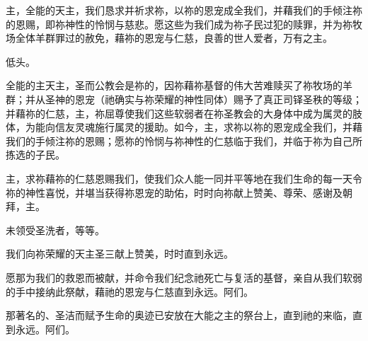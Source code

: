 \par

主，全能的天主，我们恳求并祈求祢，以祢的恩宠成全我们，并藉我们的手倾注祢的恩赐，即祢神性的怜悯与慈悲。愿这些为我们成为祢子民过犯的赎罪，并为祢牧场全体羊群罪过的赦免，藉祢的恩宠与仁慈，良善的世人爱者，万有之主。\par

\par

低头。\par

\par

全能的主天主，圣而公教会是祢的，因祢藉祢基督的伟大苦难赎买了祢牧场的羊群；并从圣神的恩宠（祂确实与祢荣耀的神性同体）赐予了真正司铎圣秩的等级；并藉祢的仁慈，主，祢屈尊使我们这些软弱者在祢圣教会的大身体中成为属灵的肢体，为能向信友灵魂施行属灵的援助。如今，主，求祢以祢的恩宠成全我们，并藉我们的手倾注祢的恩赐；愿祢的怜悯与祢神性的仁慈临于我们，并临于祢为自己所拣选的子民。\par

\par

主，求祢藉祢的仁慈恩赐我们，使我们众人能一同并平等地在我们生命的每一天令祢的神性喜悦，并堪当获得祢恩宠的助佑，时时向祢献上赞美、尊荣、感谢及朝拜，主。\par

\par

未领受圣洗者，等等。\par

\par

我们向祢荣耀的天主圣三献上赞美，时时直到永远。\par

\par

愿那为我们的救恩而被献，并命令我们纪念祂死亡与复活的基督，亲自从我们软弱的手中接纳此祭献，藉祂的恩宠与仁慈直到永远。阿们。\par

\par

那著名的、圣洁而赋予生命的奥迹已安放在大能之主的祭台上，直到祂的来临，直到永远。阿们。\par

